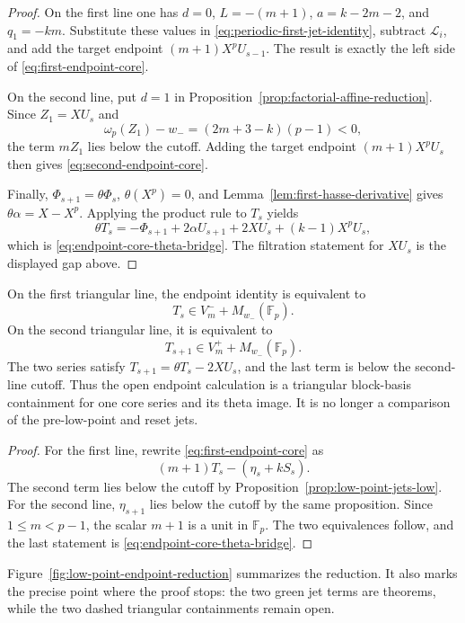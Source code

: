\begin{proof}
On the first line one has $d=0$, $L=-(m+1)$,
$a=k-2m-2$, and $q_1=-km$.  Substitute these values in
\eqref{eq:periodic-first-jet-identity}, subtract $\mathcal L_i$, and add
the target endpoint $(m+1)X^pU_{s-1}$.  The result is exactly the left
side of \eqref{eq:first-endpoint-core}.

On the second line, put $d=1$ in
Proposition~\ref{prop:factorial-affine-reduction}.  Since
$Z_1=XU_s$ and
\[
 \omega_p(Z_1)-w_-=(2m+3-k)(p-1)<0,
\]
the term $mZ_1$ lies below the cutoff.  Adding the target endpoint
$(m+1)X^pU_s$ then gives
\eqref{eq:second-endpoint-core}.

Finally, $\Phi_{s+1}=\theta\Phi_s$,
$\theta(X^p)=0$, and Lemma~\ref{lem:first-hasse-derivative} gives
$\theta\alpha=X-X^p$.  Applying the product rule to $T_s$ yields
\[
 \theta T_s
 =-\Phi_{s+1}+2\alpha U_{s+1}
   +2XU_s+(k-1)X^pU_s,
\]
which is \eqref{eq:endpoint-core-theta-bridge}.  The filtration statement
for $XU_s$ is the displayed gap above.
\end{proof}

\begin{corollary}
\label{cor:remaining-endpoint-target}
On the first triangular line, the endpoint identity is equivalent to
\[
 T_s\in V_m^-+M_{w_-}(\mathbb F_p).
\]
On the second triangular line, it is equivalent to
\[
 T_{s+1}\in V_m^++M_{w_-}(\mathbb F_p).
\]
The two series satisfy
$T_{s+1}=\theta T_s-2XU_s$, and the last term is below the second-line
cutoff.  Thus the open endpoint calculation is a triangular block-basis
containment for one core series and its theta image.  It is no longer a
comparison of the pre-low-point and reset jets.
\end{corollary}

\begin{proof}
For the first line, rewrite \eqref{eq:first-endpoint-core} as
\[
 (m+1)T_s-(\eta_s+kS_s).
\]
The second term lies below the cutoff by
Proposition~\ref{prop:low-point-jets-low}.  For the second line,
$\eta_{s+1}$ lies below the cutoff by the same proposition.  Since
$1\leq m<p-1$, the scalar $m+1$ is a unit in $\mathbb F_p$.  The two
equivalences follow, and the last statement is
\eqref{eq:endpoint-core-theta-bridge}.
\end{proof}

Figure~\ref{fig:low-point-endpoint-reduction} summarizes the reduction.  It
also marks the precise point where the proof stops: the two green jet terms
are theorems, while the two dashed triangular containments remain open.


